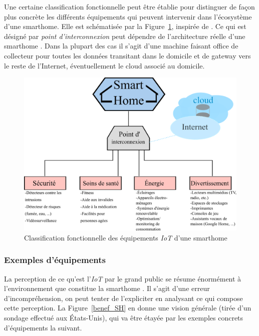 \documentclass[]{article}
\begin{document}
\par Une certaine classification fonctionnelle peut être établie pour distinguer de façon plus concrète les différents équipements qui peuvent intervenir dans l'écosystème d'une smarthome. Elle est schématisée par la Figure~\ref{sm_class}, inspirée de \cite{Basman2016}. Ce qui est désigné par \textit{point d'interconnexion} peut dépendre de l'architecture réelle d'une smarthome \cite{Huichen2016}. Dans la plupart des cas il s'agit d'une machine faisant office de collecteur pour toutes les données transitant dans le domicile et de gateway vers le reste de l'Internet, éventuellement le cloud associé au domicile.\\


\begin{figure}[!h]
\centering
\includegraphics[scale=1.3]{smarthome_class.png}
\caption{Classification fonctionnelle des équipements \textit{IoT} d'une smarthome}
\label{sm_class}
\end{figure}

\newpage

\subsubsection{Exemples d'équipements}

La perception de ce qu'est l'\textit{IoT} par le grand public se résume énormément à l'environnement que constitue la smarthome \cite{Berte2018}. Il s'agit d'une erreur d'incompréhension, on peut tenter de l'expliciter en analysant ce qui compose cette perception. La Figure~\ref{benef_SH} en donne une vision générale (tirée d'un sondage effectué aux États-Unis), qui va être étayée par les exemples concrets d'équipements la suivant.
\end{document}

